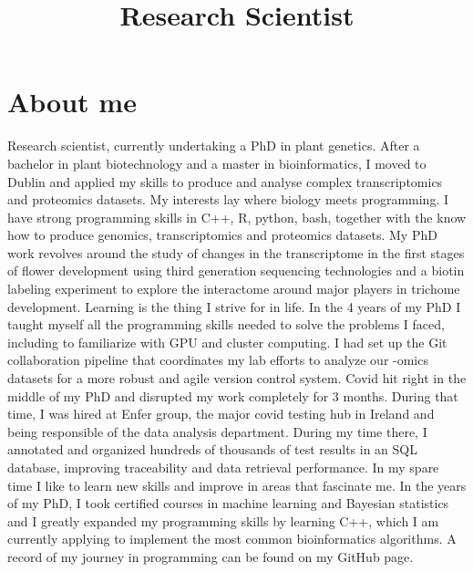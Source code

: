 \documentclass{moderncv}
\title{Research Scientist}
\begin{document}
\maketitle
\section{About me}
Research scientist, currently undertaking a PhD in plant genetics. After a
bachelor in plant biotechnology and a master in bioinformatics, I moved to
Dublin and applied my skills to produce and analyse complex transcriptomics
and proteomics datasets. My interests lay where biology meets programming. I
have strong programming skills in C++, R, python, bash, together with the know
how to produce genomics, transcriptomics and proteomics datasets. My PhD work
revolves around the study of changes in the transcriptome in the first stages
of flower development using third generation sequencing technologies and a
biotin labeling experiment to explore the interactome around major players in
trichome development. Learning is the thing I strive for in life. In the 4
years of my PhD I taught myself all the programming skills needed to solve the
problems I faced, including to familiarize with GPU and cluster computing. I
had set up the Git collaboration pipeline that coordinates my lab efforts to
analyze our -omics datasets for a more robust and agile version control
system. Covid hit right in the middle of my PhD and disrupted my work
completely for 3 months. During that time, I was hired at Enfer group, the
major covid testing hub in Ireland and being responsible of the data analysis
department. During my time there, I annotated and organized hundreds of
thousands of test results in an SQL database, improving traceability and data
retrieval performance. In my spare time I like to learn new skills and improve
in areas that fascinate me. In the years of my PhD, I took certified courses
in machine learning and Bayesian statistics and I greatly expanded my
programming skills by learning C++, which I am currently applying to implement
the most common bioinformatics algorithms. A record of my journey in
programming can be found on my GitHub page.
\end{document}
